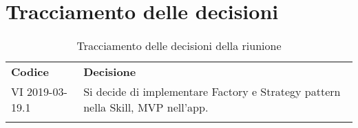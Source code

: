 \clearpage
\section{Tracciamento delle decisioni}
\begin{center}
	\renewcommand{\arraystretch}{1.5}
	\begin{longtable}{  p{2.8cm} p{11.4cm} }
		\rowcolor{tableHeadYellow}
		\textbf{Codice}&\textbf{Decisione}\\
		VI 2019-03-19.1 & Si decide di implementare Factory e Strategy pattern nella Skill, MVP nell'app.\\
		\rowcolor{white}
		\caption{Tracciamento delle decisioni della riunione}
	\end{longtable}	
\end{center}